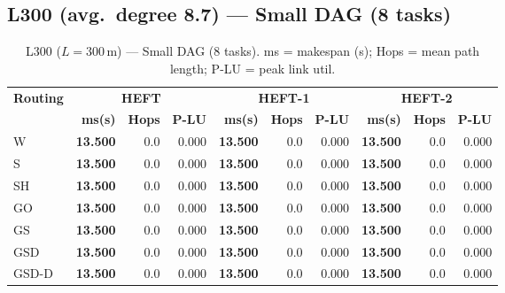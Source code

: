 \documentclass[11pt]{article}
\newcommand{\win}[1]{\textcolor{green!50!black}{\textbf{#1}}}
\begin{document}
\subsection{L300 (avg.\ degree 8.7) --- Small DAG (8 tasks)}
\begin{table}[H]
\centering\small
\begin{tabular}{l r r r r r r r r r}
\toprule
\textbf{Routing} & \multicolumn{3}{c}{\textbf{HEFT}} & \multicolumn{3}{c}{\textbf{HEFT-1}} & \multicolumn{3}{c}{\textbf{HEFT-2}} \\
\cmidrule(lr){2-4}\cmidrule(lr){5-7}\cmidrule(lr){8-10}
& \textbf{ms(s)} & \textbf{Hops} & \textbf{P-LU} & \textbf{ms(s)} & \textbf{Hops} & \textbf{P-LU} & \textbf{ms(s)} & \textbf{Hops} & \textbf{P-LU} \\
\midrule
  W & \win{13.500} & 0.0 & 0.000 & \win{13.500} & 0.0 & 0.000 & \win{13.500} & 0.0 & 0.000 \\
  S & \win{13.500} & 0.0 & 0.000 & \win{13.500} & 0.0 & 0.000 & \win{13.500} & 0.0 & 0.000 \\
  SH & \win{13.500} & 0.0 & 0.000 & \win{13.500} & 0.0 & 0.000 & \win{13.500} & 0.0 & 0.000 \\
  GO & \win{13.500} & 0.0 & 0.000 & \win{13.500} & 0.0 & 0.000 & \win{13.500} & 0.0 & 0.000 \\
  GS & \win{13.500} & 0.0 & 0.000 & \win{13.500} & 0.0 & 0.000 & \win{13.500} & 0.0 & 0.000 \\
  GSD & \win{13.500} & 0.0 & 0.000 & \win{13.500} & 0.0 & 0.000 & \win{13.500} & 0.0 & 0.000 \\
  GSD-D & \win{13.500} & 0.0 & 0.000 & \win{13.500} & 0.0 & 0.000 & \win{13.500} & 0.0 & 0.000 \\
\bottomrule
\end{tabular}
\caption{L300 ($L=300$\,m) --- Small DAG (8 tasks). ms = makespan (s); Hops = mean path length; P-LU = peak link util.}
\end{table}
\end{document}

